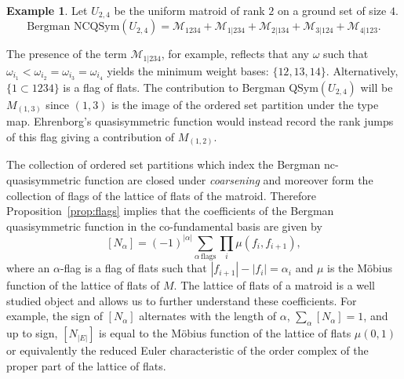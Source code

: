 \documentclass[12pt,reqno]{amsart}
\numberwithin{definition}{section}
\newtheorem{proposition}[definition]{Proposition}
\newtheorem{theorem}[definition]{Theorem}
\theoremstyle{definition}
\newtheorem{example}[definition]{Example}
\newcommand{\om}{\omega}
\newcommand{\ncM}{\mathcal{M}}
\begin{document}
\begin{example}

Let $U_{2,4}$ be the uniform matroid of rank $2$ on a ground set of
size $4$.  
$$\textrm{Bergman NCQSym}(U_{2,4})  = {\ncM}_{1234} + {\ncM}_{1|234} + {\ncM}_{2|134} + {\ncM}_{3|124} + {\ncM}_{4|123}. $$

The presence of the term ${\ncM}_{1|234}$, for example, reflects that any $\omega$ such that $\omega_{i_1} < \omega_{i_2} =
\omega_{i_3} = \omega_{i_4}$ yields the minimum weight bases:
$\{12,13,14\}$.  Alternatively, $\{ 1 \subset 1234\}$ is a flag of
flats.  The contribution to Bergman QSym$(U_{2,4})$ will be $M_{(1,3)}$ since $(1,3)$
is the image of the ordered set partition under the type map.
Ehrenborg's quasisymmetric function would instead record the rank jumps of this flag giving a contribution of $M_{(1,2)}$.


\end{example}





The collection of ordered set partitions which index the Bergman
nc-quasisymmetric function are closed under {\em coarsening} and moreover form the collection of flags of the lattice of flats of the matroid. Therefore Proposition~\ref{prop:flags} implies that the coefficients of the Bergman quasisymmetric function in the co-fundamental basis are given by
$$[N_{\alpha}] = (-1)^{|\alpha|} \sum_{\alpha \, \textrm{flags}} \prod_i \mu(f_i,f_{i+1}),$$
where an $\alpha$-flag is a flag of flats such that $|f_{i+1}| - |f_i| = \alpha_i$ and $\mu$ is the M\"{o}bius function of the lattice of flats of $M$.  The lattice of flats of a matroid is a well studied object and allows us to further understand these coefficients.  For example, the sign of $[N_{\alpha}]$ alternates with the length of $\alpha$,  $\sum_{\alpha} [N_{\alpha}] = 1$, and up to sign, $ [N_{|E|}]$ is equal to the M\"{o}bius function of the lattice
of flats $\mu(0,1)$ or equivalently the reduced Euler characteristic of the order complex of the
proper part of the lattice of flats.
\end{document}
